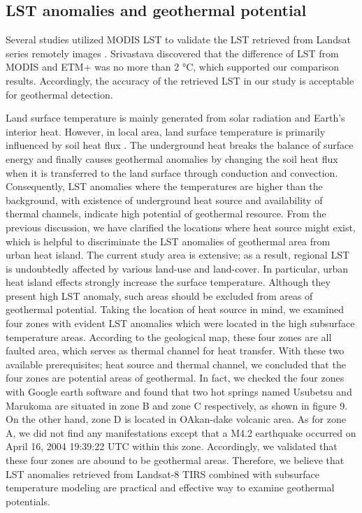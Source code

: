 \subsection{LST anomalies and geothermal potential }

Several studies utilized MODIS LST to validate the LST retrieved from Landsat series remotely images \cite{Qin2011,Srivastava2009}. Srivastava \cite{Srivastava2009} discovered that the difference of LST from MODIS and ETM+ was no more than 2 °C, which supported our comparison results. Accordingly, the accuracy of the retrieved LST in our study is acceptable for geothermal detection.

Land surface temperature is mainly generated from solar radiation and Earth’s interior heat. However, in local area, land surface temperature is primarily influenced by soil heat flux \cite{Guoweidong2002}. The underground heat breaks the balance of surface energy and finally causes geothermal anomalies by changing the soil heat flux when it is transferred to the land surface through conduction and convection. Consequently, LST anomalies where the temperatures are higher than the background, with existence of underground heat source and availability of thermal channels, indicate high potential of geothermal resource. From the previous discussion, we have clarified the locations where heat source might exist, which is helpful to discriminate the LST anomalies of geothermal area from urban heat island. The current study area is extensive; as a result, regional LST is undoubtedly affected by various land-use and land-cover. In particular, urban heat island effects strongly increase the surface temperature. Although they present high LST anomaly, such areas should be excluded from areas of geothermal potential. Taking the location of heat source in mind, we examined four zones with evident LST anomalies which were located in the high subsurface temperature areas. According to the geological map, these four zones are all faulted area, which serves as thermal channel for heat transfer. With these two available prerequisites; heat source and thermal channel, we concluded that the four zones are potential areas of geothermal. In fact, we checked the four zones with Google earth software and found that two hot springs named Usubetsu and Marukoma are situated in zone B and zone C respectively, as shown in figure 9. On the other hand, zone D is located in OAkan-dake volcanic area. As for zone A, we did not find any manifestations except that a M4.2 earthquake occurred on April 16, 2004 19:39:22 UTC within this zone. Accordingly, we validated that these four zones are abound to be geothermal areas. Therefore, we believe that LST anomalies retrieved from Landsat-8 TIRS combined with subsurface temperature modeling are practical and effective way to examine geothermal potentials.  